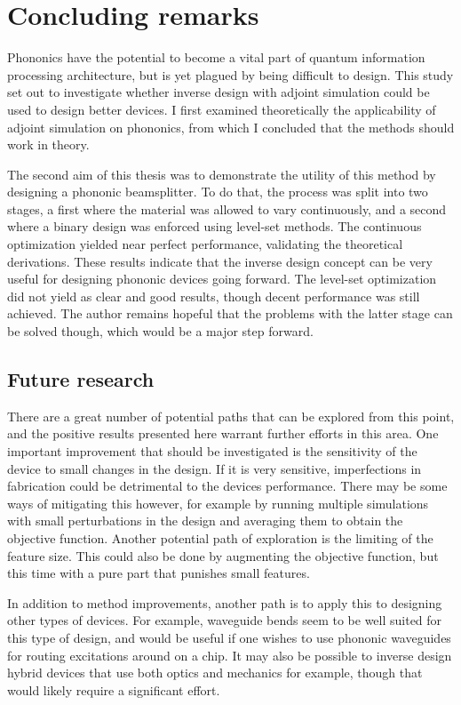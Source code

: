 \chapter{Concluding remarks}

Phononics have the potential to become a vital part of quantum information
processing architecture, but is yet plagued by being difficult to design.
This study set out to investigate whether inverse design with adjoint simulation
could be used to design better devices.
I first examined theoretically the applicability of adjoint simulation on
phononics, from which I concluded that the methods should work in theory.

The second aim of this thesis was to demonstrate the utility of this method by
designing a phononic beamsplitter.
To do that, the process was split into two stages, a first where the material
was allowed to vary continuously, and a second where a binary design was
enforced using level-set methods.
The continuous optimization yielded near perfect performance, validating the
theoretical derivations.
These results indicate that the inverse design concept can be very useful for
designing phononic devices going forward.
The level-set optimization did not yield as clear and good results, though
decent performance was still achieved.
The author remains hopeful that the problems with the latter stage can be solved
though, which would be a major step forward.

\section{Future research}

There are a great number of potential paths that can be explored from this
point, and the positive results presented here warrant further efforts in this
area.
One important improvement that should be investigated is the sensitivity of the
device to small changes in the design.
If it is very sensitive, imperfections in fabrication could be detrimental to
the devices performance.
There may be some ways of mitigating this however, for example by running
multiple simulations with small perturbations in the design and averaging them
to obtain the objective function.
Another potential path of exploration is the limiting of the feature size.
This could also be done by augmenting the objective function, but this time with
a pure part that punishes small features.

In addition to method improvements, another path is to apply this to designing
other types of devices. For example, waveguide bends seem to be well suited for
this type of design, and would be useful if one wishes to use phononic
waveguides for routing excitations around on a chip. It may also be possible to
inverse design hybrid devices that use both optics and mechanics for example,
though that would likely require a significant effort.
